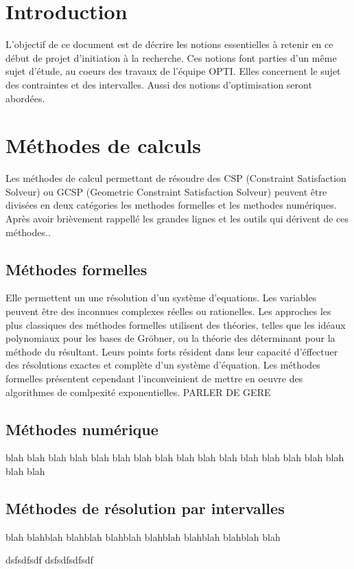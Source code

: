 \section{Introduction }
L'objectif de ce document est de décrire les notions essentielles à retenir en ce début de projet d'initiation à la recherche. Ces notions font parties d'un même sujet d'étude, au coeurs des travaux de l'équipe OPTI. Elles concernent le sujet des contraintes et des intervalles. Aussi des notions d'optimisation seront abordées.

\section{Méthodes de calculs}
Les méthodes de calcul permettant de résoudre des CSP (Constraint Satisfaction Solveur) ou GCSP (Geometric Constraint Satisfaction Solveur) peuvent être divisées en deux catégories les methodes formelles et les methodes numériques. Après avoir brièvement rappellé les grandes lignes et les outils qui dérivent de ces méthodes..

\subsection{Méthodes formelles}
Elle permettent un une résolution d'un système d'equations. Les variables peuvent être des inconnues complexes réelles ou rationelles. Les approches les plus classiques des méthodes formelles utilisent des théories, telles que les idéaux polynomiaux pour les bases de Gröbner, ou la théorie des déterminant pour la méthode du résultant.  Leurs points forts résident dans leur capacité d'éffectuer des résolutions exactes et complète d'un système d'équation. Les méthodes formelles présentent cependant l'inconveinient de mettre en oeuvre des algorithmes de comlpexité exponentielles.
PARLER DE GERE
\subsection{Méthodes numérique}
blah blah blah blah blah blah blah blah blah blah blah blah blah blah blah blah blah blah 
\subsection{Méthodes de résolution par intervalles} 
blah blahblah blahblah \cite{Jermann} blahblah blahblah blahblah\cite{Goldsztejn} blahblah blah  \cite{Goualard}


dsfsdfsdf\cite{Schichl} dsfsdfsdfsdf \cite{Neumaier}
